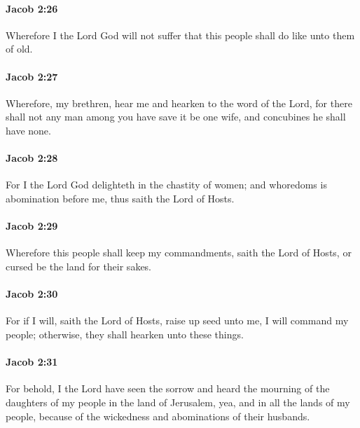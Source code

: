 		\paragraph{Jacob 2:26} %
			\label{JACOB-2-26}

			Wherefore I the Lord God will not suffer
			that this people shall do like unto them of old.

		\paragraph{Jacob 2:27} %
			\label{JACOB-2-27}

			Wherefore, my brethren, hear me and hearken to the word of the Lord,
			for there shall not any man among you have save it be one wife,
			and concubines he shall have none.

		\paragraph{Jacob 2:28} %
			\label{JACOB-2-28}

			For I the Lord God delighteth in the chastity of women;
			and whoredoms is abomination before me, thus saith the Lord of Hosts.

		\paragraph{Jacob 2:29} %
			\label{JACOB-2-29}

			Wherefore this people shall keep my commandments, saith the Lord of Hosts,
			or cursed be the land for their sakes.

		\paragraph{Jacob 2:30} %
			\label{JACOB-2-30}

			For if I will, saith the Lord of Hosts, raise up seed unto me,
			I will command my people;
			otherwise, they shall hearken unto these things.

		\paragraph{Jacob 2:31} %
			\label{JACOB-2-31}

			For behold, I the Lord have seen the sorrow and heard the mourning
			of the daughters of my people in the land of Jerusalem,
			yea, and in all the lands of my people,
			because of the wickedness and abominations of their husbands.

